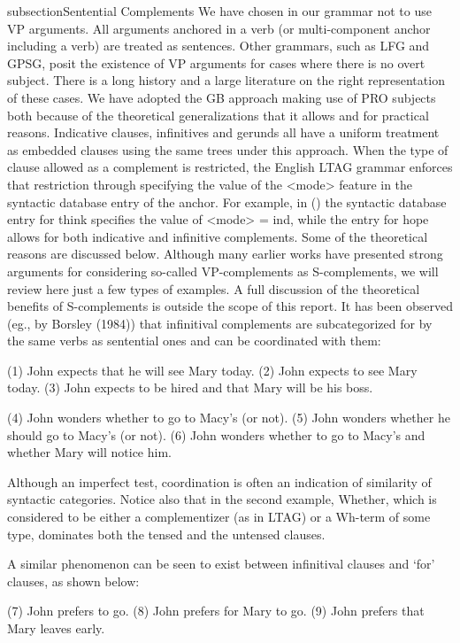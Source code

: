 subsection{Sentential Complements}
We have chosen in our grammar not to use VP arguments.  All arguments
 anchored in a verb (or multi-component anchor including a verb) are
 treated as sentences.  Other grammars, such as LFG and GPSG, posit
 the existence of VP arguments for cases where there is no overt
 subject.  There is a long history and a large literature on the right
 representation of these cases.  We have adopted the GB approach
 making use of PRO subjects both because of the theoretical
 generalizations that it allows and for practical reasons. Indicative
 clauses, infinitives and gerunds all have a uniform treatment as
 embedded clauses using the same trees under this approach.  When the
 type of clause allowed as a complement is restricted, the English
 LTAG grammar enforces that restriction through specifying the value
 of the <mode> feature in the syntactic database entry of the
 anchor. For example, in () the syntactic database entry for think
 specifies the value of <mode> = ind, while the entry for hope allows
 for both indicative and infinitive complements.  Some of the
 theoretical reasons are discussed below.  Although many earlier works
 have presented strong arguments for considering so-called
 VP-complements as S-complements, we will review here just a few types
 of examples.  A full discussion of the theoretical benefits of
 S-complements is outside the scope of this report.  It has been
 observed (eg., by Borsley (1984)) that infinitival complements are
 subcategorized for by the same verbs as sentential ones and can be
 coordinated with them:

(1)	John expects that he will see Mary today.
(2)	John expects to see Mary today.
(3)	John expects to be hired and that Mary will be his boss.


(4)	John wonders whether to go to Macy's (or not).
(5)	John wonders whether he should go to Macy's (or not).
(6)	John wonders whether to go to Macy's and whether Mary will notice him.

Although an imperfect test, coordination is often an indication of
similarity of syntactic categories.  Notice also that in the second
example, Whether,  which is considered to be either a complementizer (as in LTAG) or a Wh-term of some type, dominates both the tensed and the untensed clauses. 


A similar phenomenon can be seen to exist between infinitival clauses and `for' clauses, as shown below:

(7)	John prefers to go.
(8)	John prefers for Mary to go.
(9)	John prefers that Mary leaves early.

